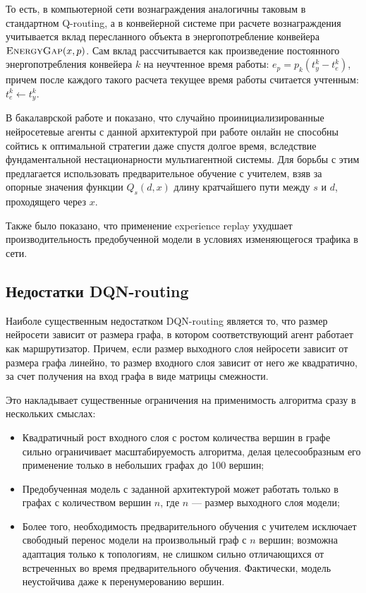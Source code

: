 \documentclass[specification,annotation,times]{itmo-student-thesis}
\theoremstyle{definition}
\begin{document}
То есть, в компьютерной сети вознаграждения аналогичны таковым в стандартном
Q-routing, а в конвейерной системе при расчете вознаграждения учитывается вклад
пересланного объекта в энергопотребление конвейера $\textsc{EnergyGap}(x, p)$.
Сам вклад рассчитывается как произведение постоянного энергопотребления
конвейера $k$ на неучтенное время работы: $e_p = p_k (t_y^k - t_e^k)$, причем
после каждого такого расчета текущее время работы считается учтенным:
$t_e^k \gets t_y^k$.

В бакалаврской работе и \cite{mukhutdinov2019multi} показано, что случайно
проинициализированные нейросетевые агенты с данной архитектурой при работе
онлайн не способны сойтись к оптимальной стратегии даже спустя долгое время,
вследствие фундаментальной нестационарности мультиагентной системы. Для борьбы с
этим предлагается использовать предварительное обучение с учителем, взяв за
опорные значения функции $Q_s(d, x)$ длину кратчайшего пути между $s$ и $d$,
проходящего через $x$.

Также было показано, что применение experience replay ухудшает
производительность предобученной модели в условиях изменяющегося трафика в сети.

\subsection{Недостатки DQN-routing}

Наиболе существенным недостатком DQN-routing является то, что размер нейросети
зависит от размера графа, в котором соответствующий агент работает как
маршрутизатор. Причем, если размер выходного слоя нейросети зависит от размера
графа линейно, то размер входного слоя зависит от него же квадратично, за счет
получения на вход графа в виде матрицы смежности.

Это накладывает существенные ограничения на применимость алгоритма сразу в
нескольких смыслах:

\begin{itemize}
\item Квадратичный рост входного слоя с ростом количества вершин в графе сильно
  ограничивает масштабируемость алгоритма, делая целесообразным его применение
  только в небольших графах до 100 вершин;
\item Предобученная модель с заданной архитектурой может работать только в
  графах с количеством вершин $n$, где $n$ --- размер выходного слоя модели;
\item Более того, необходимость предварительного обучения с учителем исключает
  свободный перенос модели на произвольный граф с $n$ вершин; возможна адаптация
  только к топологиям, не слишком сильно отличающихся от встреченных во время
  предварительного обучения. Фактически, модель неустойчива даже к
  перенумерованию вершин.
\end{itemize}
\end{document}
